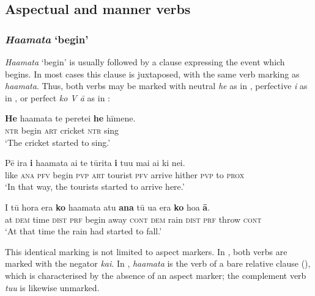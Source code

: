 \subsection{Aspectual and manner verbs}\label{sec:11.3.2}
\subsubsection{\textit{Ha{\ꞌ}amata} ‘begin’}\label{sec:11.3.2.1}
\textit{Ha{\ꞌ}amata} ‘begin’ is usually followed by a clause expressing the event which begins. In most cases this clause is juxtaposed, with the same verb marking as \textit{\mbox{ha{\ꞌ}amata}}. Thus, both verbs may be marked with neutral \textit{he} as in , perfective \textit{i} as in , or perfect \textit{ko V {\ꞌ}ā} as in :

\ea\label{ex:11.42}
\gll \textbf{He} ha{\ꞌ}amata te perete{\ꞌ}i \textbf{he} hīmene. \\
\textsc{ntr} begin \textsc{art} cricket \textsc{ntr} sing \\

\glt 
‘The cricket started to sing.’ \textstyleExampleref{[R212.052]} 
\z

\ea\label{ex:11.43}
\gll Pē ira \textbf{i} ha{\ꞌ}amata ai te tūrita \textbf{i} tu{\ꞌ}u mai ai ki nei.\\
like \textsc{ana} \textsc{pfv} begin \textsc{pvp} \textsc{art} tourist \textsc{pfv} arrive hither \textsc{pvp} to \textsc{prox}\\

\glt 
‘In that way, the tourists started to arrive here.’ \textstyleExampleref{[R376.076]} 
\z

\ea\label{ex:11.44}
\gll {\ꞌ}I tū hora era \textbf{ko} ha{\ꞌ}amata atu \textbf{{\ꞌ}ana} tū {\ꞌ}ua era \textbf{ko} hoa \textbf{{\ꞌ}ā}.\\
at \textsc{dem} time \textsc{dist} \textsc{prf} begin away \textsc{cont} \textsc{dem} rain \textsc{dist} \textsc{prf} throw \textsc{cont}\\

\glt
‘At that time the rain had started to fall.’ \textstyleExampleref{[R536.042]} 
\z

This identical marking is not limited to aspect markers. In , both verbs are marked with the negator \textit{kai}. In , \textit{ha{\ꞌ}amata} is the verb of a bare relative clause (), which is characterised by the absence of an aspect marker; the complement verb \textit{tu{\ꞌ}u} is likewise unmarked.

